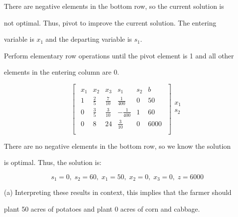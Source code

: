 \documentclass{article}
\begin{document}
\vspace{\baselineskip}

There are negative elements in the bottom row, so the current solution is 

not optimal. Thus, pivot to improve the current solution. The entering 

variable is \(x_1\) and the departing variable is \(s_1\).

\vspace{\baselineskip}

Perform elementary row operations until the pivot element is 1 and all other 

elements in the entering column are 0.


\begin{equation*}
\begin{bmatrix}
\begin{array}{ccccc|c}
x_1 & x_2 & x_3 & s_1 & s_2 & b \\
\hline
1 & \frac{2}{5} & \frac{7}{10} & \frac{1}{400} & 0 & 50 \\
0 & \frac{3}{5} & \frac{3}{10} & -\frac{1}{400} & 1 & 60 \\
\hline
0 & 8 & 24 & \frac{3}{10} & 0 & 6000 \\
\end{array}
\end{bmatrix}
\begin{array}{c}
\\
x_1 \\
s_2 \\
\\
\end{array}
\end{equation*}

\vspace{\baselineskip}

There are no negative elements in the bottom row, so we know the solution 

is optimal. Thus, the solution is:


\begin{equation*}
s_1 = 0, \; s_2 = 60, \; x_1 = 50, \; x_2 = 0, \; x_3 = 0, \; z = 6000
\end{equation*}

\vspace{\baselineskip}

(a)
Interpreting these results in context, this implies that the farmer should 

plant 50 acres of potatoes and plant 0 acres of corn and cabbage.
\end{document}
